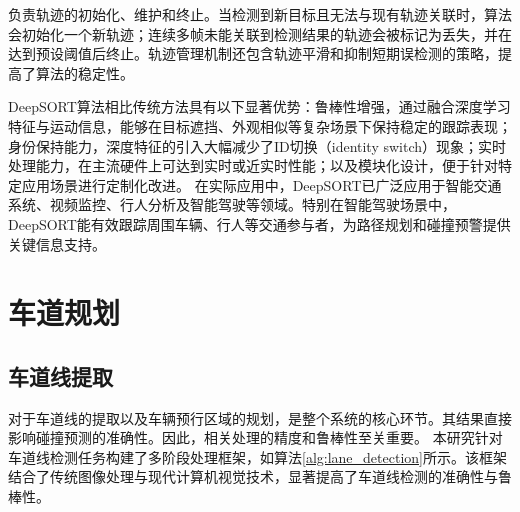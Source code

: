 \documentclass[a4paper, UTF8, fontsize=12pt]{ctexart} %
\numberwithin{equation}{section} %
\begin{document}
\begin{parlist}
\begin{circledlist}
    负责轨迹的初始化、维护和终止。当检测到新目标且无法与现有轨迹关联时，算法会初始化一个新轨迹；连续多帧未能关联到检测结果的轨迹会被标记为丢失，并在达到预设阈值后终止。轨迹管理机制还包含轨迹平滑和抑制短期误检测的策略，提高了算法的稳定性。
\end{circledlist}

DeepSORT算法相比传统方法具有以下显著优势：鲁棒性增强，通过融合深度学习特征与运动信息，能够在目标遮挡、外观相似等复杂场景下保持稳定的跟踪表现；身份保持能力，深度特征的引入大幅减少了ID切换（identity switch）现象；实时处理能力，在主流硬件上可达到实时或近实时性能；以及模块化设计，便于针对特定应用场景进行定制化改进。
在实际应用中，DeepSORT已广泛应用于智能交通系统、视频监控、行人分析及智能驾驶等领域。特别在智能驾驶场景中，DeepSORT能有效跟踪周围车辆、行人等交通参与者，为路径规划和碰撞预警提供关键信息支持。

\end{parlist}





\newpage
\renewcommand{\thefigure}{\thesection-\arabic{figure}}
\renewcommand{\thetable}{\thesection-\arabic{table}}
\renewcommand{\figurename}{图}
\setcounter{figure}{0} %
\setcounter{equation}{0} %

\section{车道规划}
\subsection{车道线提取}

对于车道线的提取以及车辆预行区域的规划，是整个系统的核心环节。其结果直接影响碰撞预测的准确性。因此，相关处理的精度和鲁棒性至关重要。
本研究针对车道线检测任务构建了多阶段处理框架，如算法\ref{alg:lane_detection}所示。该框架结合了传统图像处理与现代计算机视觉技术，显著提高了车道线检测的准确性与鲁棒性。
\end{document}
